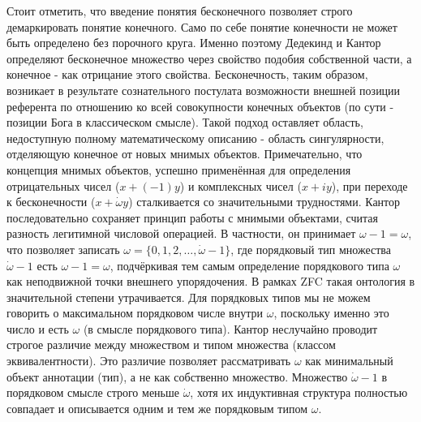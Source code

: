 \documentclass[12pt]{article}
\begin{document}
Стоит отметить, что введение понятия бесконечного позволяет строго демаркировать понятие конечного. Само по себе понятие конечности не может быть определено без порочного круга. Именно поэтому Дедекинд и Кантор определяют бесконечное множество через свойство подобия собственной части, а конечное - как отрицание этого свойства. Бесконечность, таким образом, возникает в результате сознательного постулата возможности внешней позиции референта по отношению ко всей совокупности конечных объектов (по сути - позиции Бога в классическом смысле). Такой подход оставляет область, недоступную полному математическому описанию - область сингулярности, отделяющую конечное от новых мнимых объектов. Примечательно, что концепция мнимых объектов, успешно применённая для определения отрицательных чисел ($x + (-1)y$) и комплексных чисел ($x + iy$), при переходе к бесконечности ($x + \dot{\omega} y$) сталкивается со значительными трудностями. Кантор последовательно сохраняет принцип работы с мнимыми объектами, считая разность легитимной числовой операцией. В частности, он принимает $\omega - 1 = \omega$, что позволяет записать $\omega = \{0, 1, 2, \dots, \dot{\omega} - 1 \}$, где порядковый тип множества $\dot{\omega} - 1$ есть $\omega - 1 = \omega$, подчёркивая тем самым определение порядкового типа $\omega$ как неподвижной точки внешнего упорядочения. В рамках ZFC такая онтология в значительной степени утрачивается. Для порядковых типов мы не можем говорить о максимальном порядковом числе внутри $\omega$, поскольку именно это число и есть $\omega$ (в смысле порядкового типа). Кантор неслучайно проводит строгое различие между множеством и типом множества (классом эквивалентности). Это различие позволяет рассматривать $\omega$ как минимальный объект аннотации (тип), а не как собственно множество. Множество $\dot{\omega} - 1$ в порядковом смысле строго меньше $\dot{\omega}$, хотя их индуктивная структура полностью совпадает и описывается одним и тем же порядковым типом $\omega$.
\end{document}
